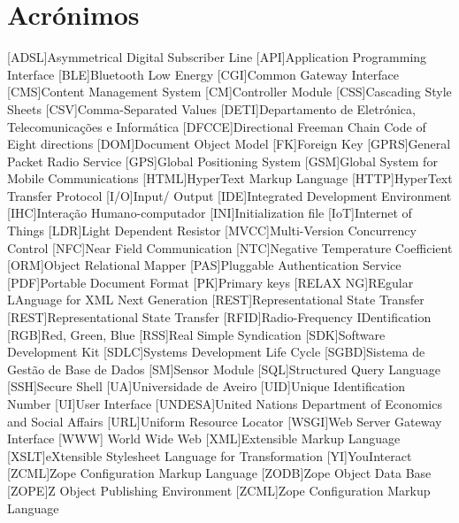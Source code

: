 \chapter*{Acrónimos}

\begin{acronym}[RELAX NG]
	
	[ADSL]{Asymmetrical Digital Subscriber Line}
	[API]{Application Programming Interface}
	[BLE]{Bluetooth Low Energy}
	[CGI]{Common Gateway Interface}
	[CMS]{Content Management System}
	[CM]{Controller Module}
	[CSS]{Cascading Style Sheets}
	[CSV]{Comma-Separated Values}
	[DETI]{Departamento de Eletrónica, Telecomunicações e Informática}
	[DFCCE]{Directional Freeman Chain Code of Eight directions}
	[DOM]{Document Object Model}
	[FK]{Foreign Key}
	[GPRS]{General Packet Radio Service}
	[GPS]{Global Positioning System}
	[GSM]{Global System for Mobile Communications}
	[HTML]{HyperText Markup Language}
	[HTTP]{HyperText Transfer Protocol}		
	[I/O]{Input/ Output}
	[IDE]{Integrated Development Environment}
	[IHC]{Interação Humano-computador}	
	[INI]{Initialization file}	
	[IoT]{Internet of Things}			
	[LDR]{Light Dependent Resistor}
	[MVCC]{Multi-Version Concurrency Control}		
	[NFC]{Near Field Communication}
	[NTC]{Negative Temperature Coefficient}
	[ORM]{Object Relational Mapper}
	[PAS]{Pluggable Authentication Service}
	[PDF]{Portable Document Format}
	[PK]{Primary keys}
	[RELAX NG]{REgular LAnguage for XML Next Generation}
	[REST]{Representational State Transfer}
	[REST]{Representational State Transfer}
	[RFID]{Radio-Frequency IDentification}
	[RGB]{Red, Green, Blue}
	[RSS]{Real Simple Syndication}
	[SDK]{Software Development Kit}
	[SDLC]{Systems Development Life Cycle}
	[SGBD]{Sistema de Gestão de Base de Dados}
	[SM]{Sensor Module}
	[SQL]{Structured Query Language}		
	[SSH]{Secure Shell}
	[UA]{Universidade de Aveiro}
	[UID]{Unique Identification Number}
	[UI]{User Interface}
	[UNDESA]{United Nations Department of Economics and Social Affairs}
	[URL]{Uniform Resource Locator}
	[WSGI]{Web Server Gateway Interface}
	[WWW]{ World Wide Web}
	[XML]{Extensible Markup Language}
	[XSLT]{eXtensible Stylesheet Language for Transformation}
	[YI]{YouInteract}		
	[ZCML]{Zope Configuration Markup Language}
	[ZODB]{Zope Object Data Base}
	[ZOPE]{Z Object Publishing Environment}
	[ZCML]{Zope Configuration Markup Language}
		
	
\end{acronym}